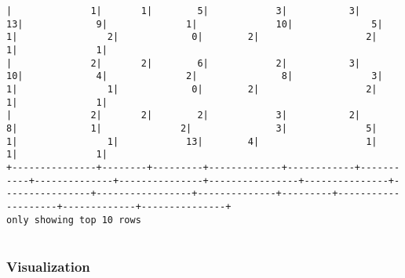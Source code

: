 \documentclass[11pt]{article}
\begin{document}
\begin{Verbatim}[commandchars=\\\{\}]
|              1|       1|        5|            3|           3|         13|             9|              1|              10|              5|               1|                2|             0|        2|                   2|            1|              1|
|              2|       2|        6|            2|           3|         10|             4|              2|               8|              3|               1|                1|             0|        2|                   2|            1|              1|
|              2|       2|        2|            3|           2|          8|             1|              2|               3|              5|               1|                1|            13|        4|                   1|            1|              1|
+---------------+--------+---------+-------------+------------+-----------+--------------+---------------+----------------+---------------+----------------+-----------------+--------------+---------+--------------------+-------------+---------------+
only showing top 10 rows


    \end{Verbatim}

    \hypertarget{visualization}{%
\subsubsection{Visualization}\label{visualization}}
\end{document}
